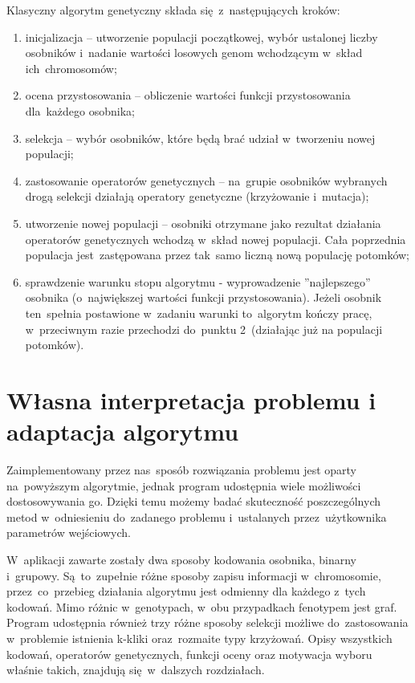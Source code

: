 \documentclass[11pt]{aghdpl}
\begin{document}
Klasyczny algorytm genetyczny składa się~z~następujących kroków:
\begin{enumerate}[noitemsep]
\item inicjalizacja – utworzenie populacji początkowej, wybór ustalonej liczby osobników i~nadanie wartości losowych 
genom wchodzącym w~skład ich~chromosomów;
\item ocena przystosowania – obliczenie wartości funkcji przystosowania dla~każdego osobnika;
\item selekcja – wybór osobników, które będą brać udział w~tworzeniu nowej populacji;
\item zastosowanie operatorów genetycznych – na~grupie osobników wybranych drogą selekcji działają
operatory genetyczne (krzyżowanie i~mutacja);
\item utworzenie nowej populacji – osobniki otrzymane jako rezultat działania operatorów
genetycznych wchodzą w~skład nowej populacji. Cała poprzednia populacja jest~zastępowana przez
tak~samo liczną nową populację potomków;
\item sprawdzenie warunku stopu algorytmu - wyprowadzenie ''najlepszego'' osobnika (o~największej wartości funkcji 
przystosowania). Jeżeli osobnik ten~spełnia postawione w~zadaniu warunki to~algorytm kończy pracę, w~przeciwnym 
razie przechodzi do~punktu 2~(działając już na populacji potomków).

\end{enumerate}
\section{Własna interpretacja problemu i adaptacja algorytmu}
\label{sec:podejscie}
Zaimplementowany przez nas~sposób rozwiązania problemu jest oparty na~powyższym algorytmie, jednak program 
udostępnia wiele możliwości dostosowywania go. Dzięki temu możemy badać skuteczność poszczególnych metod 
w~odniesieniu do~zadanego problemu i~ustalanych przez~użytkownika parametrów wejściowych.

W~aplikacji zawarte zostały dwa sposoby kodowania osobnika, binarny i~grupowy. Są~to~zupełnie różne sposoby
zapisu informacji w~chromosomie, przez~co~przebieg działania algorytmu jest odmienny dla każdego z~tych kodowań. Mimo różnic w~genotypach, 
w~obu przypadkach fenotypem jest graf.
Program udostępnia również trzy różne sposoby selekcji możliwe do~zastosowania w~problemie istnienia k-kliki oraz~rozmaite 
typy krzyżowań. Opisy wszystkich kodowań, operatorów genetycznych, funkcji oceny oraz motywacja wyboru właśnie takich, 
znajdują się~w~dalszych rozdziałach.
\end{document}
